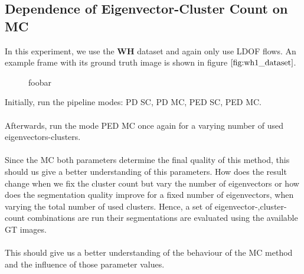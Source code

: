 \subsection{Dependence of Eigenvector-Cluster Count on MC}
In this experiment, we use the \textbf{WH} dataset and again only use LDOF flows. An example frame with its ground truth image is shown in figure $\ref{fig:wh1_dataset}$.
\begin{figure}[H]
\begin{center}
\end{center}
\caption[Segmentations Waving Hand]{foobar}
\label{fig:wh1_dataset}
\end{figure}
Initially, run the pipeline modes: PD SC, PD MC, PED SC, PED MC. \\ \\
Afterwards, run the mode PED MC once again for a varying number of used eigenvectors-clusters. \\ \\
Since the MC both parameters determine the final quality of this method, this should us give a better understanding of this parameters. How does the result change when we fix the cluster count but vary the number of eigenvectors or how does the segmentation quality improve for a fixed number of eigenvectors, when varying the total number of used clusters. Hence, a set of eigenvector-,cluster-count combinations are run their segmentations are evaluated using the available GT images. \\ \\
This should give us a better understanding of the behaviour of the MC method and the influence of those parameter values. \\ \\

